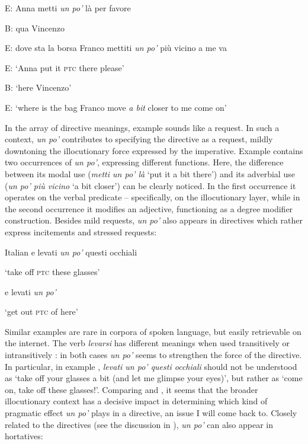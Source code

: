 E:   Anna metti \textit{un po’} là per favore

B:   qua Vincenzo

E:   dove sta la borsa Franco mettiti \textit{un po’} più vicino a me va



\glt E:  ‘Anna put it \textsc{ptc} there please’

B:  ‘here Vincenzo’

E:  ‘where is the bag Franco move \textit{a bit} closer to me come on’
    \z %

In the array of directive meanings, example  sounds like a request. In such a context, \textit{un po’} contributes to specifying the directive as a request, mildly downtoning the illocutionary force expressed by the imperative. Example  contains two occurrences of \textit{un po’}, expressing different functions. Here, the difference between its modal use (\textit{metti un po’ là} ‘put it a bit there’) and its adverbial use (\textit{un po’ più vicino} ‘a bit closer’) can be clearly noticed. In the first occurrence it operates on the verbal predicate – specifically, on the illocutionary layer, while in the second occurrence it modifies an adjective, functioning as a degree modifier construction. Besides mild requests, \textit{un po’} also appears in directives which rather express incitements and stressed requests:

\ea%
    \label{ex:key:59}

          Italian
\ea \label{ex:key:59a} e levati \textit{un po’} questi occhiali

\glt ‘take off \textsc{ptc} these glasses’

\ex \label{ex:key:59b} e levati \textit{un po’}

\glt ‘get out \textsc{ptc} of here’
    \z
\z

Similar examples are rare in corpora of spoken language, but easily retrievable on the internet. The verb \textit{levarsi} has different meanings when used transitively  or intransitively : in both cases \textit{un po’} seems to strengthen the force of the directive. In particular, in example , \textit{levati un po’ questi occhiali} should not be understood as ‘take off your glasses a bit (and let me glimpse your eyes)’, but rather as ‘come on, take off these glasses!’. Comparing  and , it seems that the broader illocutionary context has a decisive impact in determining which kind of pragmatic effect \textit{un po’} plays in a directive, an issue I will come back to. Closely related to the directives (see the discussion in ), \textit{un po’} can also appear in hortatives:

